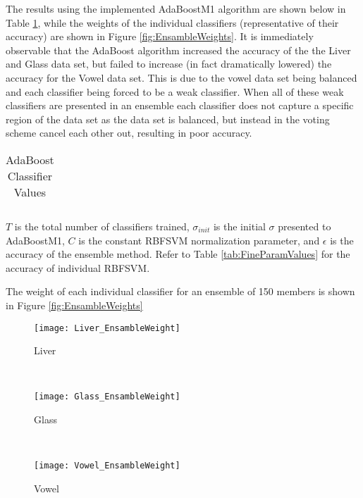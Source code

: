 The results using the implemented AdaBoostM1 algorithm are shown below in Table \ref{tab:AdaBoostValues}, while the weights of the individual classifiers (representative of their accuracy) are shown in Figure \ref{fig:EnsambleWeights}.
It is immediately observable that the AdaBoost algorithm increased the accuracy of the the Liver and Glass data set, but failed to increase (in fact dramatically lowered) the accuracy for the Vowel data set.
This is due to the vowel data set being balanced and each classifier being forced to be a weak classifier.
When all of these weak classifiers are presented in an ensemble each classifier does not capture a specific region of the data set as the data set is balanced, but instead in the voting scheme cancel each other out, resulting in poor accuracy.
\begin{table}[!ht]
\caption{AdaBoost Classifier Values}
\label{tab:AdaBoostValues}
\begin{center}
\begin{tabular}{c c c c c}
\hline

\\
\hline

\hline
\end{tabular}
\end{center}
\normalsize
$T$ is the total number of classifiers trained, $\sigma_{init}$ is the initial $\sigma$ presented to AdaBoostM1, $C$ is the constant RBFSVM normalization parameter, and $\epsilon$ is the accuracy of the ensemble method.  Refer to Table \ref{tab:FineParamValues} for the accuracy of individual RBFSVM.
\end{table}

The weight of each individual classifier for an ensemble of 150 members is shown in Figure \ref{fig:EnsambleWeights}
\begin{figure*}[!ht]
	\centering
	\begin{subfigure}[b]{0.3\textwidth}
		\centering
		\texttt{[image: Liver\_EnsambleWeight]}
      \caption{Liver}
	\end{subfigure}%
	~
	\begin{subfigure}[b]{0.3\textwidth}
		\centering
		\texttt{[image: Glass\_EnsambleWeight]}
        \caption{Glass}
	\end{subfigure}	
    ~
	\begin{subfigure}[b]{0.3\textwidth}
		\centering
		\texttt{[image: Vowel\_EnsambleWeight]}
        \caption{Vowel}
	\end{subfigure}%
	\caption{Distribution of Ensemble Weights}
	\label{fig:EnsambleWeights}
\end{figure*}
